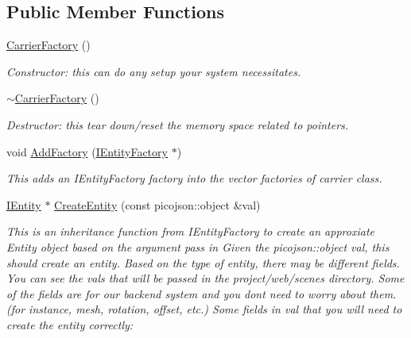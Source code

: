 \subsection*{Public Member Functions}
\begin{DoxyCompactItemize}
\item 
\mbox{\label{classcsci3081_1_1CarrierFactory_a8de8128133312b8ccc3fc875072d81ca}} 
\hyperlink{classcsci3081_1_1CarrierFactory_a8de8128133312b8ccc3fc875072d81ca}{Carrier\+Factory} ()
\begin{DoxyCompactList}\small\item\em Constructor\+: this can do any setup your system necessitates. \end{DoxyCompactList}\item 
\mbox{\label{classcsci3081_1_1CarrierFactory_afeb21b32f748e85beaded1f1bc7e960a}} 
\hyperlink{classcsci3081_1_1CarrierFactory_afeb21b32f748e85beaded1f1bc7e960a}{$\sim$\+Carrier\+Factory} ()
\begin{DoxyCompactList}\small\item\em Destructor\+: this tear down/reset the memory space related to pointers. \end{DoxyCompactList}\item 
void \hyperlink{classcsci3081_1_1CarrierFactory_a83f8a2016ad118d028336b589262e3d2}{Add\+Factory} (\hyperlink{classentity__project_1_1IEntityFactory}{I\+Entity\+Factory} $\ast$)
\begin{DoxyCompactList}\small\item\em This adds an I\+Entity\+Factory factory into the vector factories of carrier class. \end{DoxyCompactList}\item 
\hyperlink{classentity__project_1_1IEntity}{I\+Entity} $\ast$ \hyperlink{classcsci3081_1_1CarrierFactory_a02cb728c8c3c6c8bf364998272ee1fa3}{Create\+Entity} (const picojson\+::object \&val)
\begin{DoxyCompactList}\small\item\em This is an inheritance function from I\+Entity\+Factory to create an approxiate Entity object based on the argument pass in Given the picojson\+::object val, this should create an entity. Based on the type of entity, there may be different fields. You can see the vals that will be passed in the project/web/scenes directory. Some of the fields are for our backend system and you don\textquotesingle{}t need to worry about them. (for instance, mesh, rotation, offset, etc.) Some fields in val that you will need to create the entity correctly\+: \end{DoxyCompactList}\end{DoxyCompactItemize}


